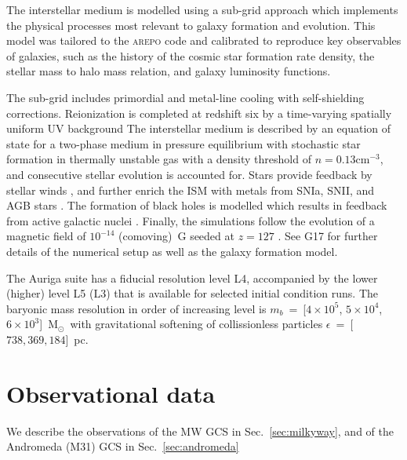 \documentclass[a4paper,fleqn,usenatbib]{mnras}
\newcommand{\Sun}[0]{\ensuremath{_{\odot}}}
\begin{document}
The interstellar medium is modelled using a sub-grid approach which implements
the physical processes most relevant to galaxy formation and evolution.
This model was tailored to the \textsc{arepo} code and calibrated to reproduce
key observables of galaxies, such as the history of the cosmic star formation rate
density, the stellar mass to halo mass relation, and galaxy luminosity functions.

The sub-grid includes primordial and metal-line cooling with self-shielding
corrections. Reionization is completed at redshift six by a time-varying
spatially uniform UV background \citep{2009ApJ...703.1416F, 2013MNRAS.436.3031V}
The interstellar medium is described by an equation of state for a two-phase medium
in pressure equilibrium \citep{2003MNRAS.339..289S} with stochastic star formation
in thermally unstable gas with a density threshold of $n = 0.13 \text{cm}^{-3}$,
and consecutive stellar evolution is accounted for. Stars provide feedback by
stellar winds \citep{2014MNRAS.437.1750M, 2017MNRAS.467..179G}, and further
enrich the ISM with metals from SNIa, SNII, and AGB stars \citep{2013MNRAS.436.3031V}.
The formation of black holes is modelled which results in feedback from active
galactic nuclei \citep{2005MNRAS.361..776S, 2014MNRAS.437.1750M, 2017MNRAS.467..179G}.
Finally, the simulations follow the evolution of a magnetic field of $10^{-14}$
(comoving)~G seeded at $z = 127$ \citep{2013MNRAS.432..176P, 2014ApJ...783L..20P}.
See G17 for further details of the numerical setup as well as the galaxy formation
model.

The Auriga suite has a fiducial resolution level L4, accompanied by the lower
(higher) level L5 (L3) that is available for selected initial condition runs.
The baryonic mass resolution in order of increasing level is $m_b$~=~[$4 \times 10^5$,
$5 \times 10^4$, $6 \times 10^3$]~M\Sun \, with gravitational softening of
collissionless particles $\epsilon$~=~[$738, 369, 184$]~pc.


%


\section{Observational data}
\label{sec:observations}
We describe the observations of the MW GCS in Sec.~\ref{sec:milkyway}, 
and of the Andromeda (M31) GCS in Sec.~\ref{sec:andromeda}
\end{document}
